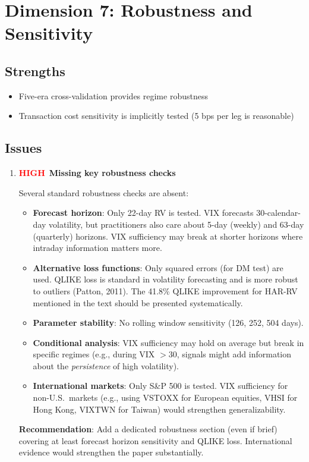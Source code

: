 \documentclass[12pt,a4paper]{article}
\newcommand{\HIGH}{\textcolor{red}{\textbf{HIGH}}}
\begin{document}
\section{Dimension 7: Robustness and Sensitivity}
\label{sec:d7}

\subsection*{Strengths}
\begin{itemize}
    \item Five-era cross-validation provides regime robustness
    \item Transaction cost sensitivity is implicitly tested (5 bps per leg is reasonable)
\end{itemize}

\subsection*{Issues}

\begin{enumerate}[label=D7.\arabic*]

\item \HIGH\ \textbf{Missing key robustness checks}

Several standard robustness checks are absent:
\begin{itemize}
    \item \textbf{Forecast horizon}: Only 22-day RV is tested. VIX forecasts 30-calendar-day volatility, but practitioners also care about 5-day (weekly) and 63-day (quarterly) horizons. VIX sufficiency may break at shorter horizons where intraday information matters more.
    \item \textbf{Alternative loss functions}: Only squared errors (for DM test) are used. QLIKE loss is standard in volatility forecasting and is more robust to outliers (Patton, 2011). The 41.8\% QLIKE improvement for HAR-RV mentioned in the text should be presented systematically.
    \item \textbf{Parameter stability}: No rolling window sensitivity (126, 252, 504 days).
    \item \textbf{Conditional analysis}: VIX sufficiency may hold on average but break in specific regimes (e.g., during VIX $> 30$, signals might add information about the \emph{persistence} of high volatility).
    \item \textbf{International markets}: Only S\&P 500 is tested. VIX sufficiency for non-U.S.\ markets (e.g., using VSTOXX for European equities, VHSI for Hong Kong, VIXTWN for Taiwan) would strengthen generalizability.
\end{itemize}
\textbf{Recommendation}: Add a dedicated robustness section (even if brief) covering at least forecast horizon sensitivity and QLIKE loss. International evidence would strengthen the paper substantially.

\end{enumerate}
\end{document}
